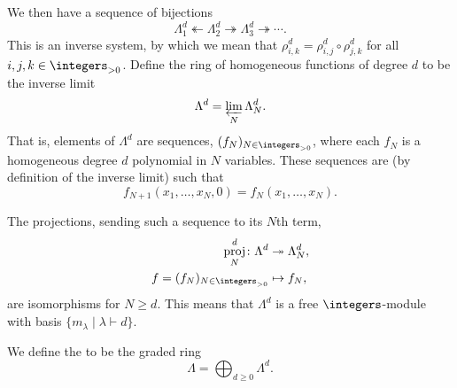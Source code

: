 \documentclass[fleqn]{NotesClass}
\newcommand{\partition}{\vdash}
\DeclareMathOperator{\proj}{proj}
\begin{document}
    We then have a sequence of bijections
    \begin{equation}
        \Lambda_1^d \twoheadleftarrow \Lambda_2^d \twoheadrightarrow \Lambda_3^d \twoheadrightarrow \dotsb.
    \end{equation}
    This is an inverse system, by which we mean that \(\rho^d_{i,k} = \rho^d_{i,j} \circ \rho^d_{j,k}\) for all \(i, j, k \in \integers_{>0}\).
    Define the ring of homogeneous functions of degree \(d\) to be the inverse limit
    \begin{equation}
        \Lambda^d = \varprojlim_N \Lambda_N^d.
    \end{equation}
    That is, elements of \(\Lambda^d\) are sequences, \((f_N)_{N \in \integers_{> 0}}\), where each \(f_N\) is a homogeneous degree \(d\) polynomial in \(N\) variables.
    These sequences are (by definition of the inverse limit) such that
    \begin{equation}
        f_{N+1}(x_1, \dotsc, x_N, 0) = f_N(x_1, \dotsc, x_N).
    \end{equation}
    
    The projections, sending such a sequence to its \(N\)th term,
    \begin{align}
        \proj^d_N \colon \Lambda^d &\twoheadrightarrow \Lambda^d_N,\\
        f = (f_N)_{N \in \integers_{>0}} &\mapsto f_N,
    \end{align}
    are isomorphisms for \(N \ge d\).
    This means that \(\Lambda^d\) is a free \(\integers\)-module with basis \(\{m_\lambda \mid \lambda \partition d\}\).
    
    We define the  to be the graded ring
    \begin{equation}
        \Lambda = \bigoplus_{d \ge 0} \Lambda^d.
    \end{equation}
    
\end{document}
